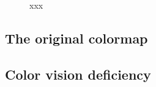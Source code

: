 \begin{figure}
\captionsetup{format = sidebyside, indention = 0cm} 
\begin{minipage}[t]{0.4\textwidth}
	\vspace{-5pt}
	\caption{xxx}
	\label{fig:sensitivityfunction}
\end{minipage}\hfill 
\begin{minipage}[t]{0.55\textwidth}
	\centering 
	\vspace{0pt}
	
\end{minipage}
\end{figure} 



\subsection{The original colormap}
\subsection{Color vision deficiency}


% 	




% 	

% 	






